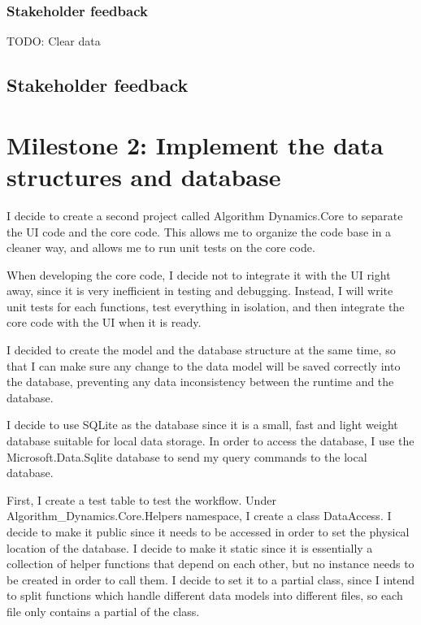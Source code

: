 \documentclass[a4paper]{report}
\begin{document}
\subsubsection{Stakeholder feedback}

TODO: Clear data

\subsection{Stakeholder feedback}



\section{Milestone 2: Implement the data structures and database}

I decide to create a second project called Algorithm Dynamics.Core to separate the UI code and the core code. This allows me to organize the code base in a cleaner way, and allows me to run unit tests on the core code.

When developing the core code, I decide not to integrate it with the UI right away, since it is very inefficient in testing and debugging. Instead, I will write unit tests for each functions, test everything in isolation, and then integrate the core code with the UI when it is ready.

I decided to create the model and the database structure at the same time, so that I can make sure any change to the data model will be saved correctly into the database, preventing any data inconsistency between the runtime and the database.

I decide to use SQLite\cite{sqlite} as the database since it is a small, fast and light weight database suitable for local data storage. In order to access the database, I use the Microsoft.Data.Sqlite\cite{microsoft:docs:sqlite} database to send my query commands to the local database.

First, I create a test table to test the workflow. Under Algorithm\_Dynamics.Core.Helpers namespace, I create a class DataAccess. I decide to make it public since it needs to be accessed in order to set the physical location of the database. I decide to make it static since it is essentially a collection of helper functions that depend on each other, but no instance needs to be created in order to call them. I decide to set it to a partial class, since I intend to split functions which handle different data models into different files, so each file only contains a partial of the class.
\end{document}
